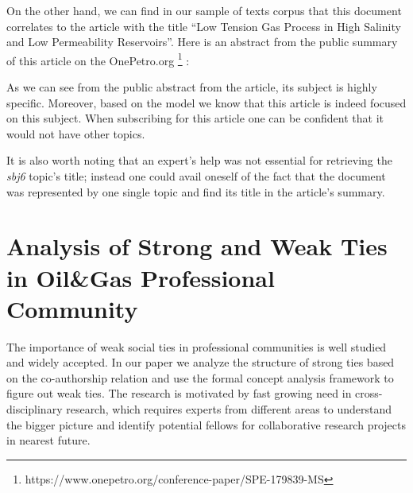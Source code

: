 \documentclass[12pt]{report}
\theoremstyle{definition}
\begin{document}
On the other hand, we can find in our sample of texts corpus that this document correlates to the article with the title ``Low Tension Gas Process in High Salinity and Low Permeability Reservoirs''. 
Here is an abstract from the public summary of this article on the OnePetro.org \footnote{https://www.onepetro.org/conference-paper/SPE-179839-MS} :


As we can see from the public abstract from the article, its subject is highly specific. 
Moreover, based on the model we know that this article is indeed focused on this subject. 
When subscribing for this article one can be confident that it would not have other topics. 

It is also worth noting that an expert's help was not essential for retrieving the \textit{sbj6} topic's title; instead one could avail oneself of the fact that the document was represented by one single topic and find its title in the article's summary. 

\section{Analysis of Strong and Weak Ties in Oil\&Gas Professional Community}
The importance of weak social ties in professional communities is well studied and widely accepted.
In our paper we analyze the structure of strong ties based on the co-authorship relation and use the formal concept analysis framework to figure out weak ties.
The research is motivated by fast growing need in cross-disciplinary research, which requires experts from different areas to understand the bigger picture and identify potential fellows for collaborative research projects in nearest future.
\end{document}
